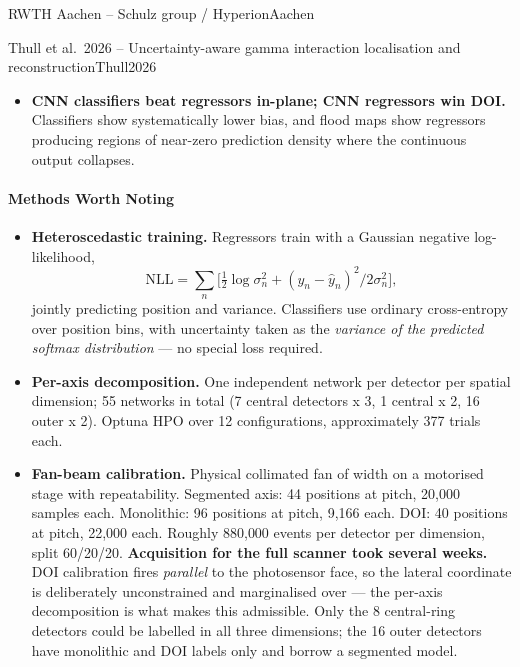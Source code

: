 \begin{programnote}{RWTH Aachen -- Schulz group / Hyperion}{Aachen}
\begin{papernote}{Thull et al.\ 2026 -- Uncertainty-aware gamma interaction localisation and reconstruction}{Thull2026}
\begin{itemize}
        rods rises from 1.0985 to 1.1840 under filtering and to 1.2171 under LOR weighting
        at $p = 4$, but COV at $p = 4$ blows out to 10.19\%. Filtering dominated weighting
        at matched effort; recovery coefficients improved at every rod diameter under both.
    \item \textbf{CNN classifiers beat regressors in-plane; CNN regressors win DOI.}
        Classifiers show systematically lower bias, and flood maps show regressors
        producing regions of near-zero prediction density where the continuous output
        collapses.
\end{itemize}

\paragraph{Methods Worth Noting}
\begin{itemize}
    \item \textbf{Heteroscedastic training.} Regressors train with a Gaussian
        negative log-likelihood,
        \[\mathrm{NLL} = \sum_n \bigl[\tfrac{1}{2}\log \sigma_n^2
            + (y_n - \hat{y}_n)^2 / 2\sigma_n^2\bigr],\]
        jointly predicting position and variance. Classifiers use ordinary
        cross-entropy over position bins, with uncertainty taken as the \emph{variance of
        the predicted softmax distribution} --- no special loss required.
    \item \textbf{Per-axis decomposition.} One independent network per detector per spatial
        dimension; 55 networks in total (7 central detectors x 3, 1 central x 2, 16 outer
        x 2). Optuna HPO over 12 configurations, approximately 377 trials each.
    \item \textbf{Fan-beam calibration.} Physical collimated fan of  width on a
        motorised stage with  repeatability. Segmented axis: 44 positions at 
        pitch, 20{,}000 samples each. Monolithic: 96 positions at  pitch, 9{,}166
        each. DOI: 40 positions at  pitch, 22{,}000 each. Roughly 880{,}000 events
        per detector per dimension, split 60/20/20. \textbf{Acquisition for the full
        scanner took several weeks.} DOI calibration fires \emph{parallel} to the
        photosensor face, so the lateral coordinate is deliberately unconstrained and
        marginalised over --- the per-axis decomposition is what makes this admissible.
        Only the 8 central-ring detectors could be labelled in all three dimensions; the 16
        outer detectors have monolithic and DOI labels only and borrow a segmented model.

\end{itemize}
\end{papernote}
\end{programnote}
